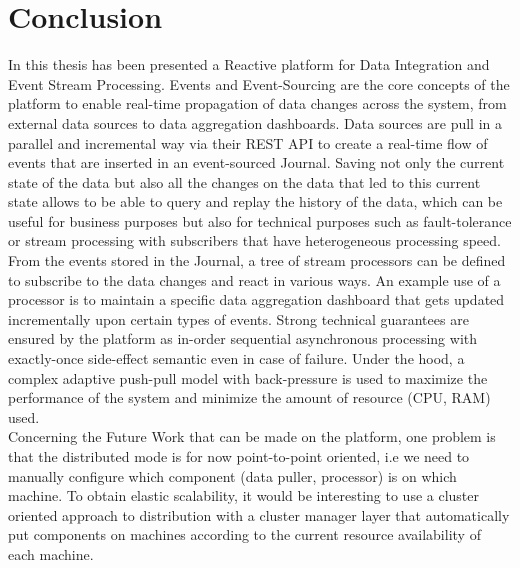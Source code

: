 \section{Conclusion}

In this thesis has been presented a Reactive platform for Data Integration and Event Stream Processing. Events and Event-Sourcing are the core concepts of the platform to enable 
real-time propagation of data changes across the system, from external data sources to data aggregation dashboards. Data sources are pull in a parallel and incremental way via their REST API to create a real-time flow of events that are inserted in an event-sourced Journal. Saving not only the current state of the data but also all the changes on the data
that led to this current state allows to be able to query and replay the history of the data, which can be useful for business purposes but also for technical purposes such as fault-tolerance or stream processing with subscribers that have heterogeneous processing speed.
From the events stored in the Journal, a tree of stream processors can be defined to subscribe to the data changes and react in various ways. An example use of a processor is to maintain a specific data aggregation dashboard that gets updated incrementally upon certain types of events. Strong technical guarantees are ensured by the platform as in-order sequential asynchronous processing with exactly-once side-effect semantic even in case of failure. Under the hood, a complex adaptive push-pull model with back-pressure is used to maximize the performance of the system and minimize the amount of resource (CPU, RAM) used.
\\

Concerning the Future Work that can be made on the platform, one problem is that the distributed mode is for now point-to-point oriented, i.e we need to manually configure which component (data puller, processor) is on which machine. To obtain elastic scalability, it would be interesting to use a cluster oriented approach to distribution with a cluster manager layer that automatically put components on machines according to the current resource availability of each machine.


